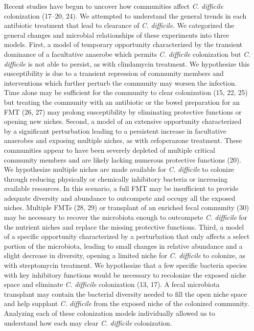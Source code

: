 \documentclass[11pt,]{article}
\begin{document}
Recent studies have begun to uncover how communities affect \emph{C.
difficile} colonization (17--20, 24). We attempted to understand the
general trends in each antibiotic treatment that lead to clearance of
\emph{C. difficile}. We categorized the general changes and microbial
relationships of these experiments into three models. First, a model of
temporary opportunity characterized by the transient dominance of a
facultative anaerobe which permits \emph{C. difficile} colonization but
\emph{C. difficile} is not able to persist, as with clindamycin
treatment. We hypothesize this susceptibility is due to a transient
repression of community members and interventions which further perturb
the community may worsen the infection. Time alone may be sufficient for
the community to clear colonization (15, 22, 25) but treating the
community with an antibiotic or the bowel preparation for an FMT (26,
27) may prolong susceptibility by eliminating protective functions or
opening new niches. Second, a model of an extensive opportunity
characterized by a significant perturbation leading to a persistent
increase in facultative anaerobes and exposing multiple niches, as with
cefoperazone treatment. These communities appear to have been severely
depleted of multiple critical community members and are likely lacking
numerous protective functions (20). We hypothesize multiple niches are
made available for \emph{C. difficile} to colonize through reducing
physically or chemically inhibitory bacteria or increasing available
resources. In this scenario, a full FMT may be insufficient to provide
adequate diversity and abundance to outcompete and occupy all the
exposed niches. Multiple FMTs (28, 29) or transplant of an enriched
fecal community (30) may be necessary to recover the microbiota enough
to outcompete \emph{C. difficile} for the nutrient niches and replace
the missing protective functions. Third, a model of a specific
opportunity characterized by a perturbation that only affects a select
portion of the microbiota, leading to small changes in relative
abundance and a slight decrease in diversity, opening a limited niche
for \emph{C. difficile} to colonize, as with streptomycin treatment. We
hypothesize that a few specific bacteria species with key inhibitory
functions would be necessary to recolonize the exposed niche space and
eliminate \emph{C. difficile} colonization (13, 17). A fecal microbiota
transplant may contain the bacterial diversity needed to fill the open
niche space and help supplant \emph{C. difficile} from the exposed niche
of the colonized community. Analyzing each of these colonization models
individually allowed us to understand how each may clear \emph{C.
difficile} colonization.
\end{document}
